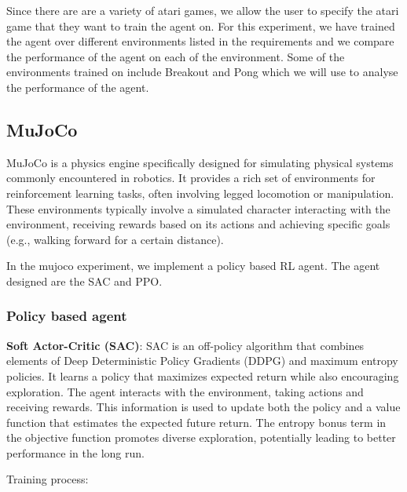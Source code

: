 \documentclass{article}
\begin{document}
Since there are are a variety of atari games, we allow the user to specify the
atari game that they want to train the agent on. For this experiment, we have
trained the agent over different environments listed in the requirements and we
compare the performance of the agent on each of the environment. Some of the
environments trained on include Breakout and Pong which we will use to analyse
the performance of the agent.

\subsection*{MuJoCo}

MuJoCo is a physics engine specifically designed for simulating physical
systems commonly encountered in robotics. It provides a rich set of
environments for reinforcement learning tasks, often involving legged
locomotion or manipulation. These environments typically involve a simulated
character interacting with the environment, receiving rewards based on its
actions and achieving specific goals (e.g., walking forward for a certain
distance).

In the mujoco experiment, we implement a policy based RL agent. The agent
designed are the SAC and PPO.

\subsubsection*{Policy based agent}

\textbf{Soft Actor-Critic (SAC)}: SAC is an off-policy algorithm that combines elements
of Deep Deterministic Policy Gradients (DDPG) and maximum entropy policies. It
learns a policy that maximizes expected return while also encouraging
exploration. The agent interacts with the environment, taking actions and
receiving rewards. This information is used to update both the policy and a
value function that estimates the expected future return. The entropy bonus
term in the objective function promotes diverse exploration, potentially
leading to better performance in the long run.

Training process:
\end{document}
